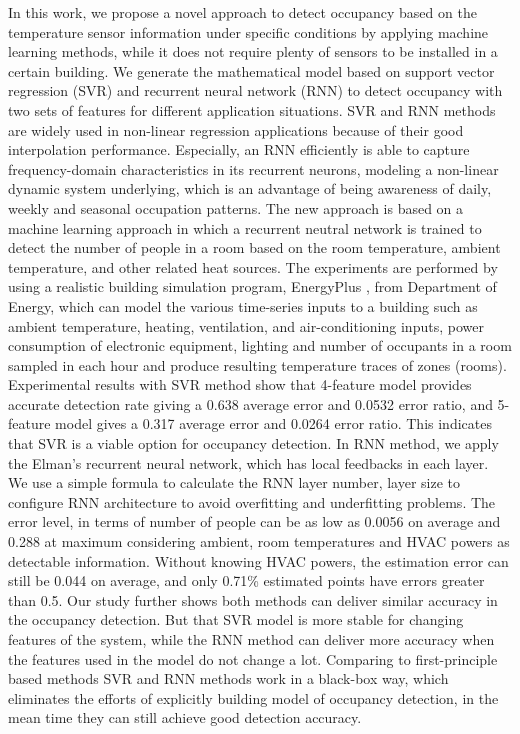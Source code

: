 In this work, we propose a novel approach to detect occupancy based on the
temperature sensor information under specific conditions by applying machine
learning methods, while it does not require plenty of sensors to be installed
in a certain building.  We generate the mathematical model based on support
vector regression (SVR) and recurrent neural network (RNN) to detect occupancy
with two sets of features for different application situations. SVR and RNN
methods are widely used in non-linear regression applications because of their
good interpolation performance. Especially, an RNN efficiently is able to
capture frequency-domain characteristics in its recurrent neurons, modeling a
non-linear dynamic system underlying, which is an advantage of being awareness
of daily, weekly and seasonal occupation patterns.  The new approach is based
on a machine learning approach in which a recurrent neutral network is trained
to detect the number of people in a room based on the room temperature, ambient
temperature, and other related heat sources. The experiments are performed by
using a realistic building simulation program, EnergyPlus
\cite{energyplus:2001vf}, from Department of Energy, which can model the
various time-series inputs to a building such as ambient temperature, heating,
ventilation, and air-conditioning inputs, power consumption of electronic
equipment, lighting and number of occupants in a room sampled in each hour and
produce resulting temperature traces of zones (rooms).  Experimental results
with SVR method show that 4-feature model provides accurate detection rate
giving a 0.638 average error and 0.0532 error ratio, and 5-feature model gives
a 0.317 average error and 0.0264 error ratio. This indicates that SVR is a
viable option for occupancy detection.  In RNN method, we apply the Elman's
recurrent neural network, which has local feedbacks in each layer. We use a
simple formula to calculate the RNN layer number, layer size to configure RNN
architecture to avoid overfitting and underfitting problems. The error level,
in terms of number of people can be as low as 0.0056 on average and 0.288 at
maximum considering ambient, room temperatures and HVAC powers as detectable
information. Without knowing HVAC powers, the estimation error can still be
0.044 on average, and only 0.71\% estimated points have errors greater than
0.5. Our study further shows both methods can deliver similar accuracy in the
occupancy detection.  But that SVR model is more stable for changing features
of the system, while the RNN method can deliver more accuracy when the features
used in the model do not change a lot.  Comparing to first-principle based
methods SVR and RNN methods work in a black-box way, which eliminates the
efforts of explicitly building model of occupancy detection, in the mean time
they can still achieve good detection accuracy.

